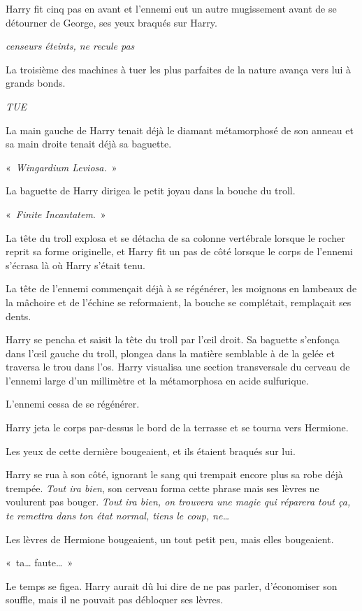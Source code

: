Harry fit cinq pas en avant et l'ennemi eut un autre mugissement avant de se détourner de George, ses yeux braqués sur Harry.

\emph{censeurs éteints, ne recule pas}

La troisième des machines à tuer les plus parfaites de la nature avança vers lui à grands bonds.

\emph{TUE}

La main gauche de Harry tenait déjà le diamant métamorphosé de son anneau et sa main droite tenait déjà sa baguette.

«~\emph{Wingardium Leviosa.}~»

La baguette de Harry dirigea le petit joyau dans la bouche du troll.

«~\emph{Finite Incantatem}.~»

La tête du troll explosa et se détacha de sa colonne vertébrale lorsque le rocher reprit sa forme originelle, et Harry fit un pas de côté lorsque le corps de l'ennemi s'écrasa là où Harry s'était tenu.

La tête de l'ennemi commençait déjà à se régénérer, les moignons en lambeaux de la mâchoire et de l'échine se reformaient, la bouche se complétait, remplaçait ses dents.

Harry se pencha et saisit la tête du troll par l'œil droit.
Sa baguette s'enfonça dans l'œil gauche du troll, plongea dans la matière semblable à de la gelée et traversa le trou dans l'os.
Harry visualisa une section transversale du cerveau de l'ennemi large d'un millimètre et la métamorphosa en acide sulfurique.

L'ennemi cessa de se régénérer.

Harry jeta le corps par-dessus le bord de la terrasse et se tourna vers Hermione.

Les yeux de cette dernière bougeaient, et ils étaient braqués sur lui.

Harry se rua à son côté, ignorant le sang qui trempait encore plus sa robe déjà trempée.
\emph{Tout ira bien}, son cerveau forma cette phrase mais ses lèvres ne voulurent pas bouger.
\emph{Tout ira bien, on trouvera une magie qui réparera tout ça, te remettra dans ton état normal, tiens le coup, ne…}

Les lèvres de Hermione bougeaient, un tout petit peu, mais elles bougeaient.

«~ta… faute…~»

Le temps se figea.
Harry aurait dû lui dire de ne pas parler, d'économiser son souffle, mais il ne pouvait pas débloquer ses lèvres.

